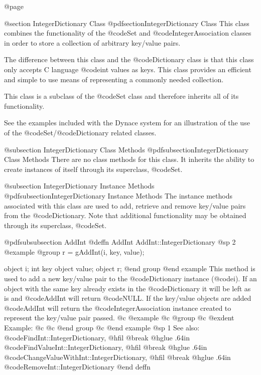 @page

@section IntegerDictionary Class
@pdfsection{IntegerDictionary Class}
This class combines the functionality of the @code{Set}
and @code{IntegerAssociation} classes in order to store a collection of
arbitrary key/value pairs.

The difference between this class and the @code{Dictionary} class is
that this class only accepts C language @code{int} values as keys.
This class provides an efficient and simple to use means of representing
a commonly needed collection.

This class is a subclass of the @code{Set} class and therefore inherits
all of its functionality.

See the examples included with the Dynace system for an illustration of the
use of the @code{Set}/@code{Dictionary} related classes.


@subsection IntegerDictionary Class Methods
@pdfsubsection{IntegerDictionary Class Methods}
There are no class methods for this class.  It inherits the ability
to create instances of itself through its superclass, @code{Set}.



@subsection IntegerDictionary Instance Methods
@pdfsubsection{IntegerDictionary Instance Methods}
The instance methods associated with this class are used to add, retrieve
and remove key/value pairs from the @code{Dictionary}.  Note that additional
functionality may be obtained through its superclass, @code{Set}.






@pdfsubsubsection {AddInt}
@deffn {AddInt} AddInt::IntegerDictionary
@sp 2
@example
@group
r = gAddInt(i, key, value);

object  i;
int     key
object  value;
object  r;
@end group
@end example
This method is used to add a new key/value pair to the @code{Dictionary}
instance (@code{i}).  If an object with the same key already exists in
the @code{Dictionary} it will be left as is and @code{AddInt} will return
@code{NULL}.  If the key/value objects are added @code{AddInt} will
return the @code{IntegerAssociation} instance created to represent the
key/value pair passed.
@c @example
@c @group
@c @exdent Example:
@c 
@c @end group
@c @end example
@sp 1
See also:  @code{FindInt::IntegerDictionary,}
@hfil @break @hglue .64in      @code{FindValueInt::IntegerDictionary,}
@hfil @break @hglue .64in      @code{ChangeValueWithInt::IntegerDictionary,}
@hfil @break @hglue .64in      @code{RemoveInt::IntegerDictionary}
@end deffn











